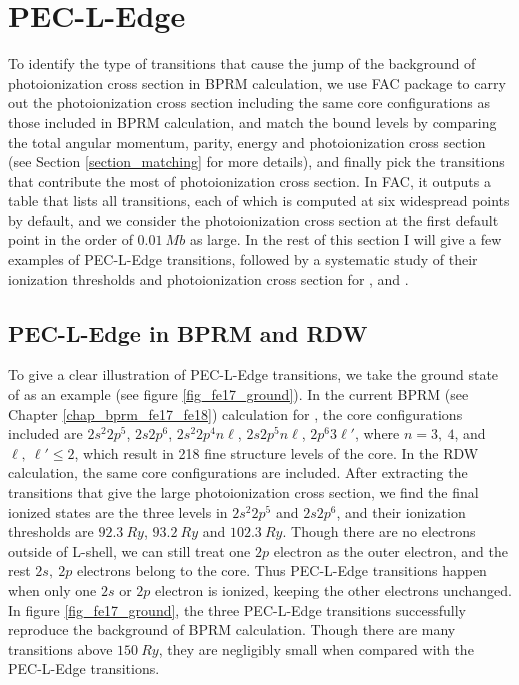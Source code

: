 \section{PEC-L-Edge}
\label{section_pec_l_edge}
To identify the type of transitions that cause the jump of the background of photoionization cross section in BPRM calculation, we use FAC package \citep{gu_2008} to carry out the photoionization cross section including the same core configurations as those included in BPRM calculation, and match the bound levels by comparing the total angular momentum, parity, energy and photoionization cross section (see Section \ref{section_matching} for more details), and finally pick the transitions that contribute the most of photoionization cross section. In FAC, it outputs a table that lists all transitions, each of which is computed at six widespread points by default, and we consider the photoionization cross section at the first default point in the order of $0.01~Mb$ as large. In the rest of this section I will give a few examples of PEC-L-Edge transitions, followed by a systematic study of their ionization thresholds and photoionization cross section for ,  and .

\subsection{PEC-L-Edge in BPRM and RDW}
To give a clear illustration of PEC-L-Edge transitions, we take the ground state of  as an example (see figure \ref{fig_fe17_ground}). In the current BPRM (see Chapter \ref{chap_bprm_fe17_fe18}) calculation for , the core configurations included are ${2s^2 2p^5}$, ${2s 2p^6}$, ${2s^2 2p^4 n\ell}$, ${2s 2p^5 n\ell}$, ${2p^6 3\ell'}$, where $n=3, ~4$, and $\ell,~ \ell'\leq2$, which result in 218 fine structure levels of the core. In the RDW calculation, the same core configurations are included. After extracting the transitions that give the large photoionization cross section, we find the final ionized states are the three levels in ${2s^2 2p^5}$ and ${2s 2p^6}$, and their ionization thresholds are $92.3~Ry$, $93.2~Ry$ and $102.3~Ry$. Though there are no electrons outside of L-shell, we can still treat one $2p$ electron as the outer electron, and the rest $2s,~2p$ electrons belong to the core. Thus PEC-L-Edge transitions happen when only one $2s$ or $2p$ electron is ionized, keeping the other electrons unchanged. In figure \ref{fig_fe17_ground}, the three PEC-L-Edge transitions successfully reproduce the background of BPRM calculation. Though there are many transitions above $150~Ry$, they are negligibly small when compared with the PEC-L-Edge transitions.

